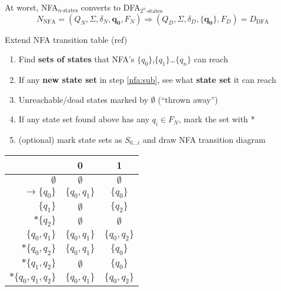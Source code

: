 At worst, NFA$_{n\text{-states}}$ converts to DFA$_{2^{n}\text{-states}}$\\
\vspace{-0.8em}
{\footnotesize
\[
  N_{\text{NFA}} = (Q_{N},\Sigma,\delta_{N},\mathbf{q_{0}},F_{N}) \Rightarrow (Q_{D},\Sigma,\delta_{D},{\mathbf{\{q_{0}\}}},F_{D}) = D_{\text{DFA}}
\]
}
{\footnotesize
\begin{minipage}{0.5\linewidth}
Extend NFA transition table (ref)
  \begin{enumerate}[align=left]
    \item\label{nfa:sub} Find \textbf{sets of states} that NFA's \(\{q_{0}\}\),\(\{q_{1}\}\)\ldots\(\{q_{n }\}\) can reach
    \item If any \textbf{new state set} in step \ref{nfa:sub}, see what \textbf{state set} it can reach
    \item Unreachable/dead states marked by \(\emptyset\)  (``thrown away'')
    \item If any state set found above has any \(q_{i} \in F_{N}\), mark the set with *
    \item (optional) mark state sets as \(S_{0\ldots i}\) and draw NFA transition diagram
  \end{enumerate}
\end{minipage}%
\begin{minipage}{0.45\linewidth}
  \centering
\begin{tabular}{r||c|c}
   & 0 & 1 \\
  \hline
  \(\emptyset\) & \(\emptyset\) & \(\emptyset\)\\
  \(\rightarrow \{q_{0}\}\) & \(\{q_{0},q_{1}\}\) & \(\{q_{0}\}\)\\
  \(\{q_{1}\}\) & \(\emptyset\) & \(\{q_{2}\}\)\\
  \(*\{q_{2}\}\) & \(\emptyset\) & \(\emptyset\)\\
  \(\{q_{0},q_{1}\}\) & \(\{q_{0},q_{1}\}\) & \(\{q_{0},q_{2}\}\)\\
  \(*\{q_{0},q_{2}\}\) & \(\{q_{0},q_{1}\}\) & \(\{q_{0}\}\)\\
  \(*\{q_{1},q_{2}\}\) & \(\emptyset\) & \(\{q_{0}\}\)\\
  \(*\{q_{0},q_{1},q_{2}\}\) & \(\{q_{0},q_{1}\}\) & \(\{q_{0},q_{2}\}\)\\
  \hline
\end{tabular}
\end{minipage}
}
